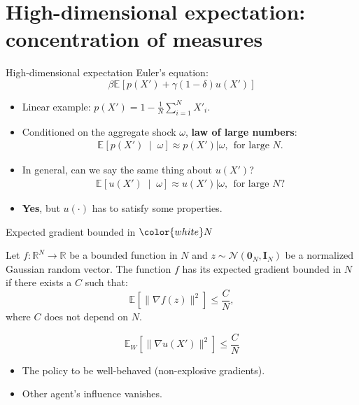 \documentclass[aspectratio=169,10pt]{beamer}
\newcommand{\emphcolor}[1]{\textbf{\textcolor{emphcolorval}{#1}}}
\newcommand{\condexpec}[3][]{\ensuremath{\mathbb{E}_{#1}\left[{#2} \; \middle| \; {#3} \right]}}
\newcommand{\expec}[2][]{\ensuremath{\mathbb{E}_{{#1}}\left[ {#2} \right]}}
\begin{document}
\section{\textcolor{PennBlue}{High-dimensional expectation: concentration of measures}}

\begin{frame}{High-dimensional expectation}
	Euler's equation:
	\begin{equation*}
		\beta \expec{p(X')+\gamma (1-\delta) u(X') }
	\end{equation*}
	\begin{itemize}
		\item Linear example: $p(X') = 1-\frac{1}{N} \sum_{i=1}^N X'_i$.
		\item Conditioned on the aggregate shock $\omega$, \emphcolor{law of large numbers}:
		\begin{align*}
		 \condexpec{p(X')}{\omega} \approx 	p(X')|\omega,  ~~\text{for large $N$}.
		\end{align*} 
		\item In general, can we say the same thing about $u(X')$? 
		\begin{align*}
			\condexpec{u(X')}{\omega} \approx 	u(X')|\omega,  ~~\text{for large $N$}?
		\end{align*} 
		\item \emphcolor{Yes}, but $u(\cdot)$ has to satisfy some properties.
	\end{itemize}
\end{frame}	
		
		
		
\begin{frame}{Expected gradient bounded in $\color{white}N$}
	\begin{definition} Let $f:\mathbb{R}^N\rightarrow \mathbb{R}$ be a bounded function in $N$ and $z\sim \mathcal{N}(\mathbf{0}_N,\mathbf{I}_N)$ be a normalized Gaussian random vector. The function $f$ has its expected gradient bounded in $N$ if there exists a $C$ such that:
		\begin{equation*}
			\expec{\|\nabla f(z)\|^2} \leq \frac{C}{N},
		\end{equation*}
		where $C$ does not depend on $N$.
	\end{definition}	
$$ \mathbb{E}_W \left[\|\nabla u(X')\|^2\right] \leq \frac{C}{N}$$
\begin{itemize}
	\item The policy to be well-behaved (non-explosive gradients).\vspace{0.1in}
	\item Other agent's influence vanishes.
\end{itemize}
\end{frame}
		
\end{document}
